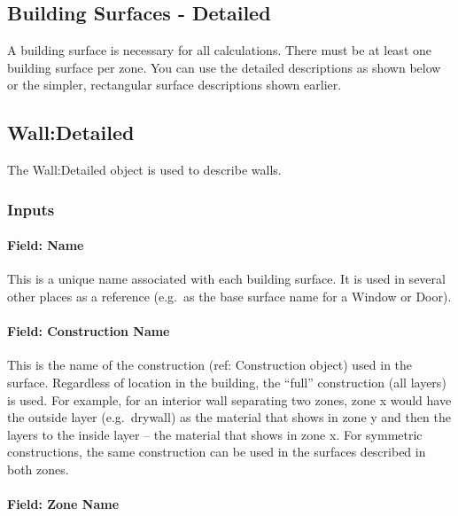 \subsection{Building Surfaces - Detailed}\label{building-surfaces---detailed}

A building surface is necessary for all calculations. There must be at least one building surface per zone. You can use the detailed descriptions as shown below or the simpler, rectangular surface descriptions shown earlier.

\subsection{Wall:Detailed}\label{walldetailed}

The Wall:Detailed object is used to describe walls.

\subsubsection{Inputs}\label{inputs-20-007}

\paragraph{Field: Name}\label{field-name-16-010}

This is a unique name associated with each building surface. It is used in several other places as a reference (e.g.~as the base surface name for a Window or Door).

\paragraph{Field: Construction Name}\label{field-construction-name-16}

This is the name of the construction (ref: Construction object) used in the surface. Regardless of location in the building, the ``full'' construction (all layers) is used. For example, for an interior wall separating two zones, zone x would have the outside layer (e.g.~drywall) as the material that shows in zone y and then the layers to the inside layer -- the material that shows in zone x. For symmetric constructions, the same construction can be used in the surfaces described in both zones.

\paragraph{Field: Zone Name}\label{field-zone-name-10-000}


